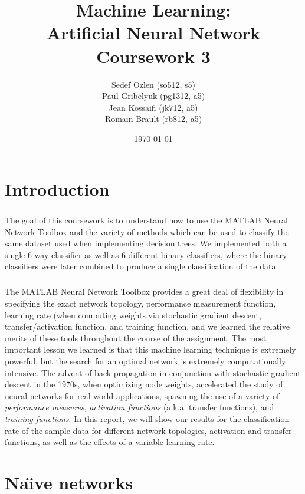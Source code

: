 \documentclass[a4paper,12pt,oneside,final]{report}
\author{
    Sedef Ozlen (so512, s5) \\ 
    Paul Gribelyuk (pg1312, a5)\\
    Jean Kossaifi (jk712, a5)\\ 
    Romain Brault (rb812, a5)}
\title{\Huge Machine Learning: \\ Artificial Neural Network \\ Coursework 3}
\date{\today}
\begin{document}
\maketitle
\tableofcontents
\listoffigures

\chapter{Introduction}
\paragraph{}
The goal of this coursework is to understand how to use the MATLAB Neural Network Toolbox and the variety of methods which can be used to classify the same dataset used when implementing decision trees.  We implemented both a single 6-way classifier as well as 6 different binary classifiers, where the binary classifiers were later combined to produce a single classification of the data.
\paragraph{}
The MATLAB Neural Network Toolbox provides a great deal of flexibility in specifying the exact network topology, performance measurement function, learning rate (when computing weights via stochastic gradient descent, transfer/activation function, and training function, and we learned the relative merits of these tools throughout the course of the assignment.  The most important lesson we learned is that this machine learning technique is extremely powerful, but the search for an optimal network is extremely computationally intensive.  The advent of back propagation in conjunction with stochastic gradient descent in the 1970s, when optimizing node weights, accelerated the study of neural networks for real-world applications, spawning the use of a variety of \emph{performance measures}, \emph{activation functions} (a.k.a. transfer functions), and \emph{training functions}.  In this report, we will show our results for the classification rate of the sample data for different network topologies, activation and transfer functions, as well as the effects of a variable learning rate. 

\chapter{Na\"\i ve networks}
\end{document}
